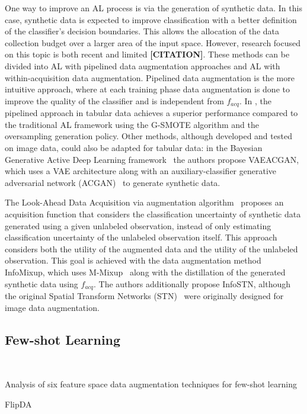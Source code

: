 \documentclass[parskip=full]{scrartcl}
\begin{document}
One way to improve an AL process is via the generation of synthetic data. In
this case, synthetic data is expected to improve classification with a better
definition of the classifier's decision boundaries. This allows the allocation
of the data collection budget over a larger area of the input space. However,
research focused on this topic is both recent and limited \textbf{[CITATION]}.
These methods can be divided into AL with pipelined data augmentation
approaches and AL with within-acquisition data augmentation. Pipelined data
augmentation is the more intuitive approach, where at each training phase data
augmentation is done to improve the quality of the classifier and is
independent from $f_{acq}$. In \citet{fonseca2021increasing}, the pipelined
approach in tabular data achieves a superior performance compared to the
traditional AL framework using the G-SMOTE algorithm and the oversampling
generation policy. Other methods, although developed and tested on image data,
could also be adapted for tabular data: in the Bayesian Generative Active Deep
Learning framework~\cite{tran2019bayesian} the authors propose VAEACGAN, which
uses a VAE architecture along with an auxiliary-classifier generative
adversarial network (ACGAN)~\cite{odena2017conditional} to generate synthetic
data.

The Look-Ahead Data Acquisition via augmentation algorithm~\cite{kim2021lada}
proposes an acquisition function that considers the classification uncertainty
of synthetic data generated using a given unlabeled observation, instead of
only estimating classification uncertainty of the unlabeled observation
itself. This approach considers both the utility of the augmented data and the
utility of the unlabeled observation. This goal is achieved with the data
augmentation method InfoMixup, which uses M-Mixup~\cite{verma2019manifold}
along with the distillation of the generated synthetic data using $f_{acq}$.
The authors additionally propose InfoSTN, although the original Spatial
Transform Networks (STN)~\cite{jaderberg2015spatial} were originally designed
for image data augmentation.


\subsection{Few-shot Learning}~\label{sec:few-shot-learning}

Analysis of six feature space data augmentation techniques for few-shot
learning~\cite{kumar2019closer}

FlipDA~\cite{zhou2021flipda}
\end{document}
